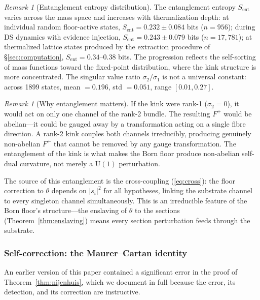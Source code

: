 \documentclass[11pt,a4paper]{article}
\theoremstyle{definition}
\theoremstyle{remark}
\newtheorem{remark}[theorem]{Remark}
\begin{document}
\begin{remark}[Entanglement entropy distribution]\label{rem:ent_distribution}
The entanglement entropy $S_{\mathrm{ent}}$ varies across the mass space and increases with thermalization depth: at individual random floor-active states, $S_{\mathrm{ent}}=0.232\pm 0.084$ bits ($n=956$); during DS dynamics with evidence injection, $S_{\mathrm{ent}}=0.243\pm 0.079$ bits ($n=17{,}781$); at thermalized lattice states produced by the extraction procedure of \S\ref{sec:computation}, $S_{\mathrm{ent}}=0.34$--$0.38$ bits. The progression reflects the self-sorting of mass functions toward the fixed-point distribution, where the kink structure is more concentrated. The singular value ratio $\sigma_2/\sigma_1$ is not a universal constant: across 1899 states, mean $=0.196$, std $=0.051$, range $[0.01, 0.27]$.
\end{remark}

\begin{remark}[Why entanglement matters]\label{rem:ent_matters}
If the kink were rank-1 ($\sigma_2=0$), it would act on only one channel of the rank-2 bundle. The resulting $F^+$ would be abelian---it could be gauged away by a transformation acting on a single fibre direction. A rank-2 kink couples both channels irreducibly, producing genuinely non-abelian $F^+$ that cannot be removed by any gauge transformation. The entanglement of the kink is what makes the Born floor produce non-abelian self-dual curvature, not merely a $\mathrm{U}(1)$ perturbation.

The source of this entanglement is the cross-coupling (\ref{eq:cross}): the floor correction to $\theta$ depends on $|s_i|^2$ for all hypotheses, linking the substrate channel to every singleton channel simultaneously. This is an irreducible feature of the Born floor's structure---the enslaving of $\theta$ to the sections (Theorem~\ref{thm:enslaving}) means every section perturbation feeds through the substrate.
\end{remark}

\subsubsection{Self-correction: the Maurer--Cartan identity}\label{sec:maurer_cartan}

An earlier version of this paper contained a significant error in the proof of Theorem~\ref{thm:nijenhuis}, which we document in full because the error, its detection, and its correction are instructive.
\end{document}
